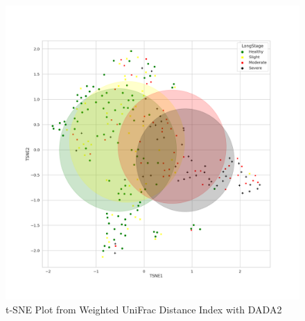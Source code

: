 \documentclass[a4paper]{article}
\begin{document}
            \begin{figure}[p]
                \centering
                \includegraphics[width=0.6 \linewidth]{figures/BetaDiversity/DADA2.weighted_unifrac.png}
                \caption{t-SNE Plot from Weighted UniFrac Distance Index with DADA2}
                \label{fig:tsne-weighted-dada2}
            \end{figure}
\end{document}
